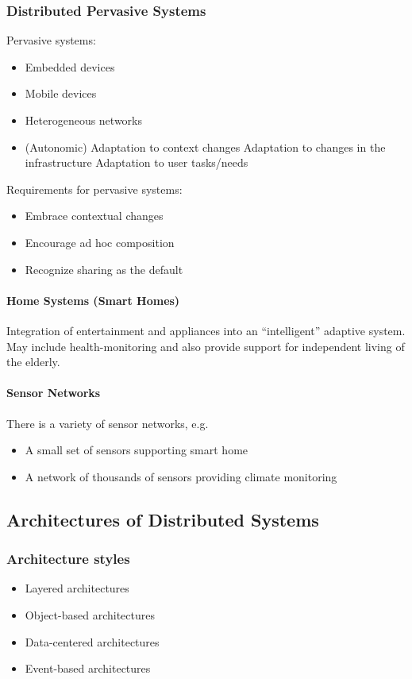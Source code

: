 \subsubsection{Distributed Pervasive Systems}
Pervasive systems:
\begin{itemize}
	\item Embedded devices
	\item Mobile devices
	\item Heterogeneous networks
	\item (Autonomic) Adaptation to context changes
	\subitem Adaptation to changes in the infrastructure
	\subitem Adaptation to user tasks/needs
\end{itemize}
Requirements for pervasive systems:
\begin{itemize}
	\item Embrace contextual changes
	\item Encourage ad hoc composition
	\item Recognize sharing as the default
\end{itemize}

\paragraph{Home Systems (Smart Homes)}
Integration of entertainment and appliances into an ``intelligent'' adaptive system. May include health-monitoring and also provide support for independent living of the elderly.

\paragraph{Sensor Networks}
There is a variety of sensor networks, e.g.
\begin{itemize}
	\item A small set of sensors supporting smart home
	\item A network of thousands of sensors providing climate monitoring
\end{itemize}

\subsection{Architectures of Distributed Systems}
\subsubsection{Architecture styles}
\begin{itemize}
	\item Layered architectures
	\item Object-based architectures
	\item Data-centered architectures
	\item Event-based architectures
\end{itemize}

